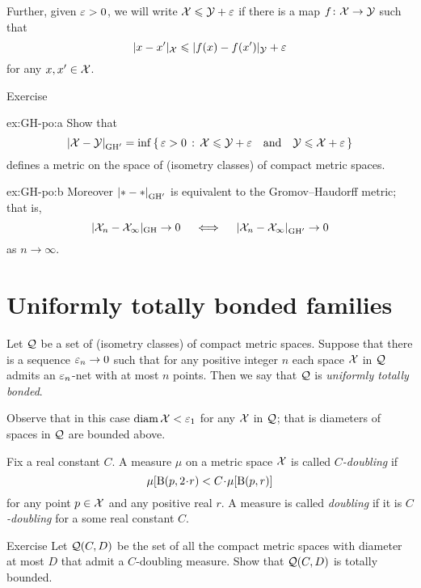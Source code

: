 Further, given $\varepsilon>0$, we will write $\mathcal{X}\leqslant \mathcal{Y}+\varepsilon$
if there is a map $f\colon\mathcal{X}\to \mathcal{Y}$ such that 
$$|x-x'|_{\mathcal{X}}\leqslant|f(x)-f(x')|_{\mathcal{Y}}+\varepsilon$$
for any $x,x'\in \mathcal{X}$.

\begin{thm}{Exercise}\label{ex:GH-po}
\begin{subthm}{ex:GH-po:a}
Show that 
$$\dist{\spc{X}}{\spc{Y}}{\GH'}=\inf\set{\eps>0}{\spc{X}\le \spc{Y}+\eps
\quad\text{and}\quad
\spc{Y}\le \spc{X}+\eps}$$
defines a metric on the space of (isometry classes) of compact metric spaces.
\end{subthm}

\begin{subthm}{ex:GH-po:b}
Moreover $\dist{*}{*}{\GH'}$ is equivalent to the Gromov--Haudorff metric;
that is,
$$|\spc{X}_n-\spc{X}_\infty|_{\GH}\to 0 
\quad\iff\quad 
\dist{\spc{X}_n}{\spc{X}_\infty}{\GH'}\to 0$$ 
as $n\to\infty$.
\end{subthm}
\end{thm}


\section{Uniformly totally bonded families}

Let $\mathcal{Q}$ be a set of (isometry classes) of compact metric spaces.
Suppose that there is a sequence $\varepsilon_n\to 0$ such that for any positive integer $n$ each space $\mathcal{X}$ in $\mathcal{Q}$ admits an $\varepsilon_n$-net with at most $n$ points.
Then we say that $\mathcal{Q}$ is \emph{uniformly totally bonded}.

Observe that in this case $\operatorname{\rm diam}\nolimits\mathcal{X}<\varepsilon_1$ for any  $\mathcal{X}$ in $\mathcal{Q}$; that is diameters of spaces in $\mathcal{Q}$ are bounded above.

Fix a real constant $C$.
A measure $\mu$ on a metric space $\mathcal{X}$ is called \emph{$C$-doubling} if
\[\mu[\oBall(p,2\cdot r)< C\cdot\mu[\oBall(p,r)]\]
for any point $p\in \mathcal{X}$ and any positive real $r$.
A measure is called \emph{doubling} if it is {}\emph{$C$-doubling} for a some real constant $C$.

\begin{thm}{Exercise}\label{pr:doubling}
Let $\mathcal{Q}(C,D)$ be the set of all the compact metric spaces with diameter at most $D$ that admit a $C$-doubling measure.
Show that $\mathcal{Q}(C,D)$ is totally bounded.
\end{thm}


